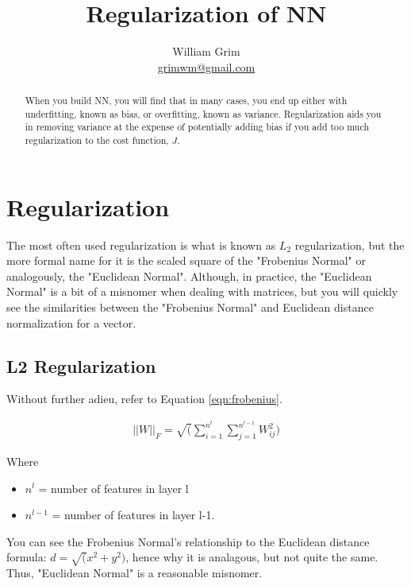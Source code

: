 \documentclass{article}
\begin{document}
\title {Regularization of NN}
\author{William Grim \\ \href{mailto:grimwm@gmail.com}{grimwm@gmail.com}}

\maketitle

\begin{abstract}
When you build NN, you will find that in many cases, you end up either with underfitting, known as bias, or overfitting, known as variance.  Regularization aids you in removing variance at the expense of potentially adding bias if you add too much regularization to the cost function, $J$.
\end{abstract}

\section{Regularization}

The most often used regularization is what is known as $L_{2}$ regularization, but the more formal name for it is the scaled square of the "Frobenius Normal" or analogously, the "Euclidean Normal".  Although, in practice, the "Euclidean Normal" is a bit of a misnomer when dealing with matrices, but you will quickly see the similarities between the "Frobenius Normal" and Euclidean distance normalization for a vector.

\subsection{L2 Regularization}

Without further adieu, refer to Equation \ref{eqn:frobenius}.

\begin{gather} \label{eqn:frobenius}
||W||_{F} = \sqrt(\sum_{i=1}^{n^{l}} \sum_{j=1}^{n^{l-1}} W_{ij}^{2})
\end{gather}

Where
\begin{itemize}
\item $n^{l}$ = number of features in layer l
\item $n^{l-1}$ = number of features in layer l-1.
\end{itemize}

You can see the Frobenius Normal's relationship to the Euclidean distance formula: $d = \sqrt(x^{2} + y^{2})$, hence why it is analagous, but not quite the same.  Thus, "Euclidean Normal" is a reasonable misnomer.
\end{document}
